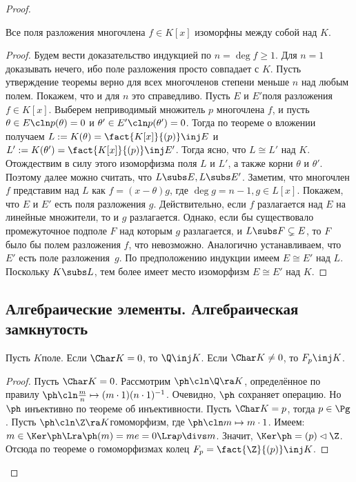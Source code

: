 \documentclass[a4paper]{article}
\newcommand{\kph}{\Ker \ph}
\begin{document}
\begin{proof}
\begin{theorem}
Все поля разложения многочлена $f \in K[x]$ изоморфны между собой над $K$.
\end{theorem}
\begin{proof}
Будем вести доказательство индукцией по $n=\deg f \ge 1$. Для $n=1$ доказывать  нечего, ибо поле разложения
просто совпадает с $K$. Пусть утверждение теоремы верно для всех многочленов степени меньше $n$ над любым
полем. Покажем, что и для $n$ это справедливо. Пусть $E$ и $E'$\т поля разложения $f \in K[x]$. Выберем
неприводимый множитель $p$ многочлена $f$, и пусть $\theta \in E\cln p(\theta)=0$ и $\theta' \in E'\cln
p(\theta')=0$. Тогда по теореме о вложении получаем $L := K(\theta)=\fact{K[x]}{(p)} \inj E$ и
$L':=K(\theta')=\fact{K[x]}{(p)} \inj E'$. Тогда ясно, что $L\cong L'$ над $K$. Отождествим в силу этого
изоморфизма поля $L$ и $L'$, а также корни $\theta$ и $\theta'$. Поэтому далее можно считать, что $L \subs E,
L \subs E'$. Заметим, что многочлен $f$ представим над $L$ как $f=(x-\theta)g$, где $\deg g = n-1, g \in
L[x]$. Покажем, что $E$ и $E'$ есть поля разложения $g$. Действительно, если $f$ разлагается над $E$ на
линейные множители, то и $g$ разлагается. Однако, если бы существовало промежуточное подполе $F$ над которым
$g$ разлагается, и $L \subs F \subsetneq E$, то $F$ было бы полем разложения $f$, что невозможно. Аналогично
устанавливаем, что $E'$ есть поле разложения~$g$. По предположению индукции имеем $E \cong E'$ над $L$.
Поскольку $K \subs L$, тем более имеет место изоморфизм $E \cong E'$ над $K$.
\end{proof}

\subsection{Алгебраические элементы. Алгебраическая замкнутость}

\begin{theorem}
Пусть $K$\т поле. Если $\Char K = 0$, то $\Q \inj K$. Если $\Char K \neq 0$, то $F_p \inj K$.
\end{theorem}
\begin{proof}
Пусть $\Char K = 0$. Рассмотрим $\ph\cln \Q \ra K$, определённое по правилу  $\ph\cln \frac{m}{n} \mapsto (m\cdot
1)(n\cdot 1)^{-1}$. Очевидно, $\ph$ сохраняет операцию. Но $\ph$ инъективно по теореме об инъективности.
Пусть $\Char K = p$, тогда $p \in \Pg$. Пусть $\ph\cln \Z \ra K$\т гомоморфизм, где $\ph\cln m \mapsto m \cdot 1$.
Имеем: $m \in \kph \Lra \ph(m)=me=0 \Lra p \divs m$. Значит, $\kph = (p) \lhd \Z$. Отсюда по теореме о
гомоморфизмах колец $F_p = \fact{\Z}{(p)} \inj K$.
\end{proof}


\end{proof}
\end{document}
